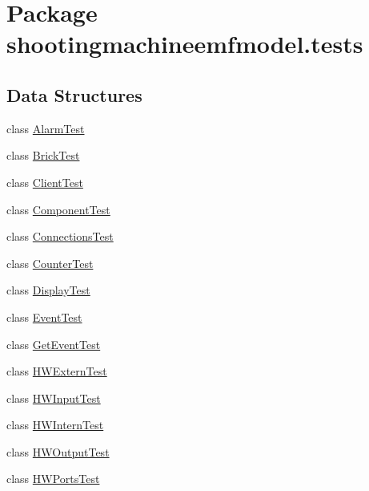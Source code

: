 \hypertarget{namespaceshootingmachineemfmodel_1_1tests}{\section{Package shootingmachineemfmodel.\-tests}
\label{namespaceshootingmachineemfmodel_1_1tests}
}
\subsection*{Data Structures}
\begin{DoxyCompactItemize}
\item 
class \hyperlink{classshootingmachineemfmodel_1_1tests_1_1_alarm_test}{Alarm\-Test}
\item 
class \hyperlink{classshootingmachineemfmodel_1_1tests_1_1_brick_test}{Brick\-Test}
\item 
class \hyperlink{classshootingmachineemfmodel_1_1tests_1_1_client_test}{Client\-Test}
\item 
class \hyperlink{classshootingmachineemfmodel_1_1tests_1_1_component_test}{Component\-Test}
\item 
class \hyperlink{classshootingmachineemfmodel_1_1tests_1_1_connections_test}{Connections\-Test}
\item 
class \hyperlink{classshootingmachineemfmodel_1_1tests_1_1_counter_test}{Counter\-Test}
\item 
class \hyperlink{classshootingmachineemfmodel_1_1tests_1_1_display_test}{Display\-Test}
\item 
class \hyperlink{classshootingmachineemfmodel_1_1tests_1_1_event_test}{Event\-Test}
\item 
class \hyperlink{classshootingmachineemfmodel_1_1tests_1_1_get_event_test}{Get\-Event\-Test}
\item 
class \hyperlink{classshootingmachineemfmodel_1_1tests_1_1_h_w_extern_test}{H\-W\-Extern\-Test}
\item 
class \hyperlink{classshootingmachineemfmodel_1_1tests_1_1_h_w_input_test}{H\-W\-Input\-Test}
\item 
class \hyperlink{classshootingmachineemfmodel_1_1tests_1_1_h_w_intern_test}{H\-W\-Intern\-Test}
\item 
class \hyperlink{classshootingmachineemfmodel_1_1tests_1_1_h_w_output_test}{H\-W\-Output\-Test}
\item 
class \hyperlink{classshootingmachineemfmodel_1_1tests_1_1_h_w_ports_test}{H\-W\-Ports\-Test}
\item 

\end{DoxyCompactItemize}

